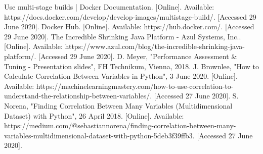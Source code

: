 \documentclass[conference]{IEEEtran}
\begin{document}
\begin{thebibliography}{00}
 Use multi-stage builds | Docker Documentation. [Online]. Available: https://docs.docker.com/develop/develop-images/multistage-build/. [Accessed 29 June 2020].
 Docker Hub. [Online]. Available: https://hub.docker.com/. [Accessed 29 June 2020].
 The Incredible Shrinking Java Platform - Azul Systems, Inc.. [Online]. Available: https://www.azul.com/blog/the-incredible-shrinking-java-platform/. [Accessed 29 June 2020].
 D. Meyer, "Performance Assessment \& Tuning - Presentation slides", FH Technikum, Vienna, 2018.
 J. Brownlee, "How to Calculate Correlation Between Variables in Python", 3 June 2020. [Online]. Available: https://machinelearningmastery.com/how-to-use-correlation-to-understand-the-relationship-between-variables/. [Accessed 27 June 2020].
 S. Norena, "Finding Correlation Between Many Variables (Multidimensional Dataset) with Python", 26 April 2018. [Online]. Available: https://medium.com/@sebastiannorena/finding-correlation-between-many-variables-multidimensional-dataset-with-python-5deb3f39ffb3. [Accessed 27 June 2020].
\end{thebibliography}
\end{document}
